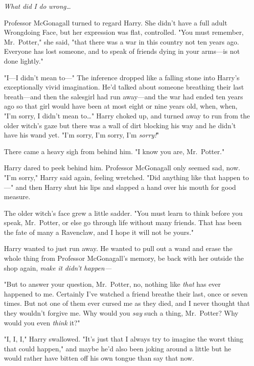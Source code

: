 \emph{What did I do wrong{\ldots}}

Professor McGonagall turned to regard Harry. She didn't have a full adult 
Wrongdoing Face, but her expression was flat, controlled. "You must remember, 
Mr.~Potter," she said, "that there was a war in this country not ten years ago. 
Everyone has lost someone, and to speak of friends dying in your arms---is not 
done lightly."

"I---I didn't mean to---" The inference dropped like a falling stone into 
Harry's exceptionally vivid imagination. He'd talked about someone breathing 
their last breath---and then the salesgirl had run away---and the war had ended 
ten years ago so that girl would have been at most eight or nine years old, 
when, when, "I'm sorry, I didn't mean to{\ldots}" Harry choked up, and turned 
away to run from the older witch's gaze but there was a wall of dirt blocking 
his way and he didn't have his wand yet. "I'm sorry, I'm sorry, I'm 
\emph{sorry!}"

There came a heavy sigh from behind him. "I know you are, Mr.~Potter."

Harry dared to peek behind him. Professor McGonagall only seemed sad, now. "I'm 
sorry," Harry said again, feeling wretched. "Did anything like that happen 
to---" and then Harry shut his lips and slapped a hand over his mouth for good 
measure.

The older witch's face grew a little sadder. "You must learn to think before 
you speak, Mr.~Potter, or else go through life without many friends. That has 
been the fate of many a Ravenclaw, and I hope it will not be yours."

Harry wanted to just run away. He wanted to pull out a wand and erase the whole 
thing from Professor McGonagall's memory, be back with her outside the shop 
again, \emph{make it didn't happen---}

"But to answer your question, Mr.~Potter, no, nothing like \emph{that} has ever 
happened to me. Certainly I've watched a friend breathe their last, once or 
seven times. But not one of them ever cursed me as they died, and I never 
thought that they wouldn't forgive me. Why would you \emph{say} such a thing, 
Mr.~Potter? Why would you even \emph{think} it?"

"I, I, I," Harry swallowed. "It's just that I always try to imagine the worst 
thing that could happen," and maybe he'd also been joking around a little but 
he would rather have bitten off his own tongue than say that now.

